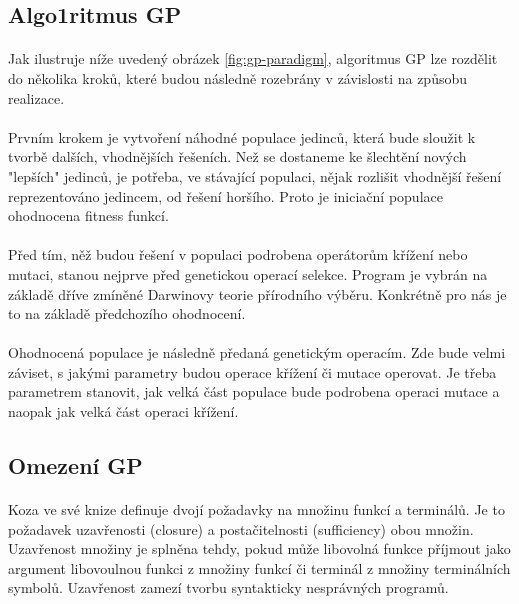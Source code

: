 \documentclass[bc,male,java,dept460]{diploma}		%
\begin{document}

\subsection{Algo1ritmus GP}
\paragraph*{}
Jak ilustruje níže uvedený obrázek \ref{fig:gp-paradigm}, algoritmus GP lze rozdělit do několika kroků, které budou následně rozebrány v závislosti na způsobu realizace.

\paragraph*{}
Prvním krokem je vytvoření náhodné populace jedinců, která bude sloužit k tvorbě dalších, vhodnějších řešeních.
Než se dostaneme ke šlechtění nových "lepších" jedinců, je potřeba, ve stávající populaci, nějak rozlišit vhodnější řešení reprezentováno jedincem, od řešení horšího. Proto je iniciační populace ohodnocena fitness funkcí.

\paragraph*{}
Před tím, něž budou řešení v populaci podrobena operátorům křížení nebo mutaci, stanou nejprve před genetickou operací selekce. Program je vybrán na základě dříve zmíněné Darwinovy teorie přírodního výběru. Konkrétně pro nás je to na základě předchozího ohodnocení.

\paragraph*{}
Ohodnocená populace je následně předaná genetickým operacím. Zde bude velmi záviset, s jakými parametry budou operace křížení či mutace operovat. Je třeba parametrem stanovit, jak velká část populace bude podrobena operaci mutace a naopak jak velká část operaci křížení. 

\subsection{Omezení GP}
\paragraph*{}
Koza ve své knize definuje \cite{kozagp} dvojí požadavky na množinu funkcí a terminálů. Je to požadavek uzavřenosti (closure) a postačitelnosti (sufficiency) obou množin. Uzavřenost množiny je splněna tehdy, pokud může libovolná funkce příjmout jako argument libovoulnou funkci z množiny funkcí či terminál z množiny terminálních symbolů. Uzavřenost zamezí tvorbu syntakticky nesprávných programů.
\end{document}
